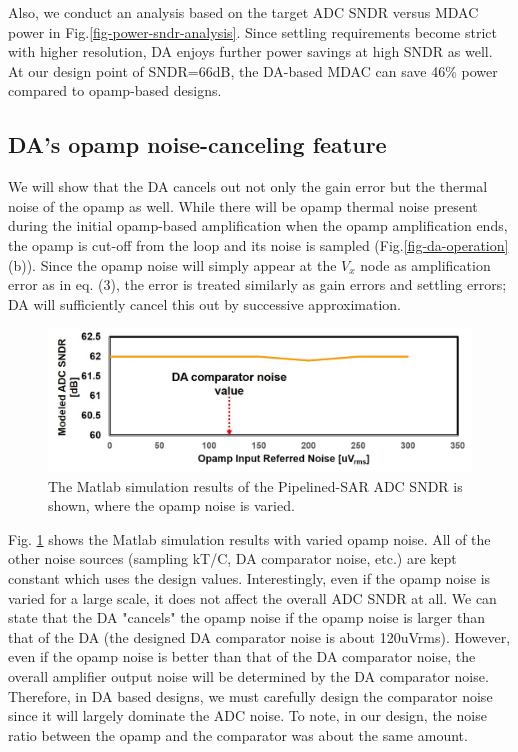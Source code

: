 Also, we conduct an analysis based on the target ADC SNDR versus MDAC power in Fig.\ref{fig-power-sndr-analysis}. Since settling requirements become strict with higher resolution, DA enjoys further power savings at high SNDR as well. At our design point of SNDR=66dB, the DA-based MDAC can save 46\% power compared to opamp-based designs.

\subsection{DA's opamp noise-canceling feature}
We will show that the DA cancels out not only the gain error but the thermal noise of the opamp as well. While there will be opamp thermal noise present during the initial opamp-based amplification when the opamp amplification ends, the opamp is cut-off from the loop and its noise is sampled  (Fig.\ref{fig-da-operation}(b)). Since the opamp noise will simply appear at the $V_x$ node as amplification error as in eq. (3), the error is treated similarly as gain errors and settling errors;
DA will sufficiently cancel this out by successive approximation.

\begin{figure}[!]
\centering
  \includegraphics[width=1\textwidth]{figure/chap2/opamp-noise.jpg}
  \caption{The Matlab simulation results of the Pipelined-SAR ADC SNDR is shown, where the opamp noise is varied. }
  \label{fig-noise-opamp}
\end{figure}

Fig. \ref{fig-noise-opamp} shows the Matlab simulation results with varied opamp noise.
All of the other noise sources (sampling kT/C, DA comparator noise, etc.) are kept constant which uses the design values.
Interestingly, even if the opamp noise is varied for a large scale, it does not affect the overall ADC SNDR at all.
We can state that the DA "cancels" the opamp noise if the opamp noise is larger than that of the DA (the designed DA comparator noise is about 120uVrms). However, even if the opamp noise is better than that of the DA comparator noise, the overall amplifier output noise will be determined by the DA comparator noise. Therefore, in DA based designs, we must carefully design the comparator noise since it will largely dominate the ADC noise.
To note, in our design, the noise ratio between the opamp and the comparator was about the same amount.

